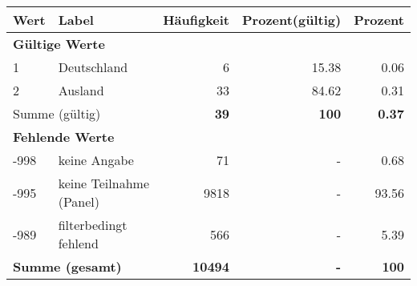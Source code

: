      \begin{longtable}{lXrrr}
     \toprule
     \textbf{Wert} & \textbf{Label} & \textbf{Häufigkeit} & \textbf{Prozent(gültig)} & \textbf{Prozent} \\
     \endhead
     \midrule
     \multicolumn{5}{l}{\textbf{Gültige Werte}}\\

     1 &
     \multicolumn{1}{X}{ Deutschland   } &


       \num{6} &
       \num[round-mode=places,round-precision=2]{15,38} &
         \num[round-mode=places,round-precision=2]{0,06} \\

     2 &
     \multicolumn{1}{X}{ Ausland   } &


       \num{33} &
       \num[round-mode=places,round-precision=2]{84,62} &
         \num[round-mode=places,round-precision=2]{0,31} \\
     \midrule
     \multicolumn{2}{l}{Summe (gültig)} &
       \textbf{\num{39}} &
     \textbf{100} &
       \textbf{\num[round-mode=places,round-precision=2]{0,37}} \\
     \multicolumn{5}{l}{\textbf{Fehlende Werte}}\\
       -998 &
       keine Angabe &
         \num{71} &
        - &
         \num[round-mode=places,round-precision=2]{0,68} \\
       -995 &
       keine Teilnahme (Panel) &
         \num{9818} &
        - &
         \num[round-mode=places,round-precision=2]{93,56} \\
       -989 &
       filterbedingt fehlend &
         \num{566} &
        - &
         \num[round-mode=places,round-precision=2]{5,39} \\
     \midrule
     \multicolumn{2}{l}{\textbf{Summe (gesamt)}} &
          \textbf{\num{10494}} &
        \textbf{-} &
        \textbf{100} \\
     \bottomrule
     \end{longtable}
     
